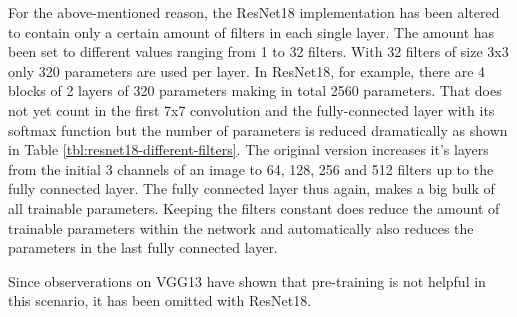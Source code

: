 For the above-mentioned reason, the ResNet18 implementation has been altered to contain only a certain amount of filters in each single layer. The amount has been set to different values ranging from 1 to 32 filters. With 32 filters of size 3x3 only 320 parameters are used per layer. In ResNet18, for example, there are 4 blocks of 2 layers of 320 parameters making in total 2560 parameters. That does not yet count in the first 7x7 convolution and the fully-connected layer with its softmax function but the number of parameters is reduced dramatically as shown in Table \ref{tbl:resnet18-different-filters}. The original version increases it's layers from the initial 3 channels of an image to 64, 128, 256 and 512 filters up to the fully connected layer. The fully connected layer thus again, makes a big bulk of all trainable parameters. Keeping the filters constant does reduce the amount of trainable parameters within the network and automatically also reduces the parameters in the last fully connected layer.

Since observerations on VGG13 have shown that pre-training is not helpful in this scenario, it has been omitted with ResNet18.


\begin{table}[h] \centering
{}
\caption{Resnet18 with different number of filters on the FINAL dataset. The number of filters present in paranthesis is the number of filters used per layer.}
\label{tbl:resnet18-different-filters}
\end{table}

